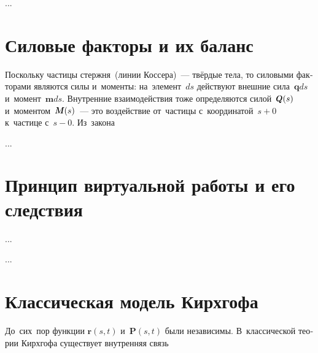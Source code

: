 \begin{otherlanguage}{russian}
...



\section{Силовые факторы и их баланс}

Поскольку частицы стержня~(линии Коссера)~--- твёрдые тела, то силовыми факторами являются силы и~моменты: на~элемент~$ds$ действуют внешние сила~${\bm{q}ds}$ и~момент~${\bm{m}ds}$. Внутренние взаимо\-действия тоже определяются силой~${\mathboldQ \hspace{.1ex} (s)}$ и~моментом~${\mathboldM \hspace{.1ex} (s)}$~--- это воздействие от~частицы с~координатой~${s\!+\!0}$ к~частице с~${s\!-\!0}$. Из~закона

...



\section{Принцип виртуальной работы и его следствия}



...






...



\section{Классическая модель Кирхгофа}

До~сих~пор функции ${\bm{r}(s,t)}$ и~${\bm{P}(s,t)}$ были независимы. В~классической теории Кирхгофа существует внутренняя связь


\end{otherlanguage}
